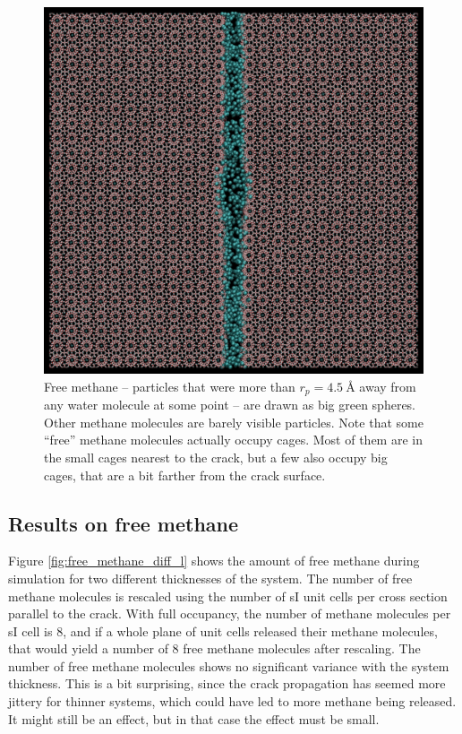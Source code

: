 \begin{figure}
\centering
\includegraphics[width=\textwidth]{../pictures/free_methane.pdf}
\caption{Free methane -- particles that were more than $r_p = \SI{4.5}{\angstrom}$ away from any water molecule at some point -- are drawn as big green spheres. Other methane molecules are barely visible particles. Note that some ``free'' methane molecules actually occupy cages. Most of them are in the small cages nearest to the crack, but a few also occupy big cages, that are a bit farther from the crack surface. }
\label{fig:free_methane}
\end{figure}


\subsection{Results on free methane}
Figure \ref{fig:free_methane_diff_l} shows the amount of free methane during simulation for two different thicknesses of the system. The number of free methane molecules is rescaled using the number of sI unit cells per cross section parallel to the crack. With full occupancy, the number of methane molecules per sI cell is 8, and if a whole plane of unit cells released their methane molecules, that would yield a number of 8 free methane molecules after rescaling. The number of free methane molecules shows no significant variance with the system thickness. This is a bit surprising, since the crack propagation has seemed more jittery for thinner systems, which could have led to more methane being released. It might still be an effect, but in that case the effect must be small. 

